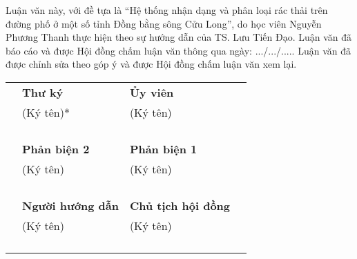 \documentclass[./thesis.tex]{subfiles}
\begin{document}
{\fontsize{13}{12} \selectfont
Luận văn này, với đề tựa là “Hệ thống nhận dạng và phân loại rác thải trên đường phố ở một số tỉnh Đồng bằng sông Cửu Long”, do học viên Nguyễn Phương Thanh thực hiện theo sự hướng dẫn của TS. Lưu Tiến Đạo. Luận văn đã báo cáo và được Hội đồng chấm luận văn thông qua ngày: .../.../..... Luận văn đã được chỉnh sửa theo góp ý và được Hội đồng chấm luận văn xem lại.
}


\begin{table}[h!]
\centering
\begin{tabularx}{\columnwidth}{cXXc}

&\textbf{Thư ký} & \textbf{Ủy viên}&\\ 
&(Ký tên)* & (Ký tên)&\\ 
\\ 
\\
\\
\\
&\textbf{Phản biện 2} & \textbf{Phản biện 1}&\\ 
&(Ký tên) & (Ký tên)\\ 
\\ 
\\
\\
\\
&\textbf{Người hướng dẫn} & \textbf{Chủ tịch hội đồng}&\\ 
&(Ký tên) & (Ký tên)&\\ 
\\ 
\\
\\
\\
\end{tabularx}
\end{table}
\end{document}
